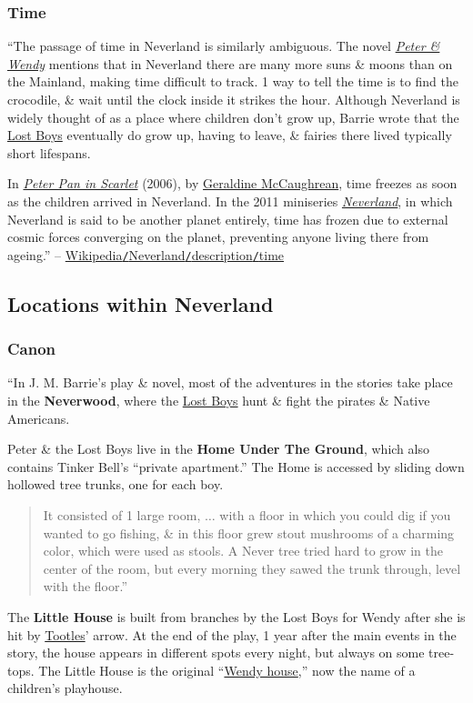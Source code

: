 \documentclass[oneside]{book}
\numberwithin{equation}{section}
\begin{document}
\subsubsection{Time}
``The passage of time in Neverland is similarly ambiguous. The novel \href{https://en.wikipedia.org/wiki/Peter_and_Wendy}{\textit{Peter \& Wendy}} mentions that in Neverland there are many more suns \& moons than on the Mainland, making time difficult to track. 1 way to tell the time is to find the crocodile, \& wait until the clock inside it strikes the hour. Although Neverland is widely thought of as a place where children don't grow up, Barrie wrote that the \href{https://en.wikipedia.org/wiki/Lost_Boys_(Peter_Pan)}{Lost Boys} eventually do grow up, having to leave, \& fairies there lived typically short lifespans.

In \href{https://en.wikipedia.org/wiki/Peter_Pan_in_Scarlet}{\textit{Peter Pan in Scarlet}} (2006), by \href{https://en.wikipedia.org/wiki/Geraldine_McCaughrean}{Geraldine McCaughrean}, time freezes as soon as the children arrived in Neverland. In the 2011 miniseries \href{https://en.wikipedia.org/wiki/Neverland_(miniseries)}{\textit{Neverland}}, in which Neverland is said to be another planet entirely, time has frozen due to external cosmic forces converging on the planet, preventing anyone living there from ageing.'' -- \href{https://en.wikipedia.org/wiki/Neverland#Time}{Wikipedia\texttt{/}Neverland\texttt{/}description\texttt{/}time}

\subsection{Locations within Neverland}

\subsubsection{Canon}
``In J. M. Barrie's play \& novel, most of the adventures in the stories take place in the \textbf{Neverwood}, where the \href{https://en.wikipedia.org/wiki/Lost_Boys_(Peter_Pan)}{Lost Boys} hunt \& fight the pirates \& Native Americans.

Peter \& the Lost Boys live in the \textbf{Home Under The Ground}, which also contains Tinker Bell's ``private apartment.'' The Home is accessed by sliding down hollowed tree trunks, one for each boy.
\begin{quotation}
	It consisted of 1 large room, $\ldots$ with a floor in which you could dig if you wanted to go fishing, \& in this floor grew stout mushrooms of a charming color, which were used as stools. A Never tree tried hard to grow in the center of the room, but every morning they sawed the trunk through, level with the floor.''
\end{quotation}
The \textbf{Little House} is built from branches by the Lost Boys for Wendy after she is hit by \href{https://en.wikipedia.org/wiki/Tootles}{Tootles}' arrow. At the end of the play, 1 year after the main events in the story, the house appears in different spots every night, but always on some tree-tops. The Little House is the original ``\href{https://en.wikipedia.org/wiki/Wendy_house}{Wendy house},'' now the name of a children's playhouse.
\end{document}
